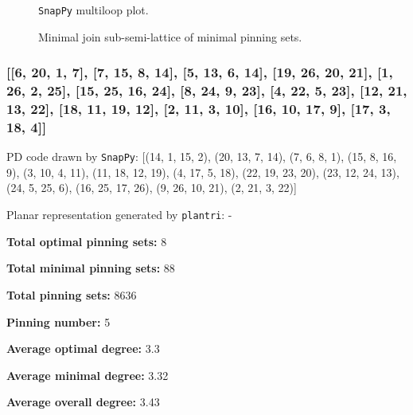 \documentclass{article}%
\begin{document}
\begin{multicols}{2}
\begin{figure}[H]
\centering

\caption{\texttt{SnapPy} multiloop plot.}
\label{fig:tex/img/[[22, 26, 1, 23], [23, 9, 24, 10], [16, 21, 17, 22], [7, 25, 8, 26], [1, 8, 2, 9], [24, 2, 25, 3], [10, 15, 11, 16], [11, 20, 12, 21], [17, 6, 18, 7], [3, 14, 4, 15], [4, 19, 5, 20], [12, 5, 13, 6], [.svg}
\end{figure}
\columnbreak

\begin{figure}[H]
\centering
\scalebox{0.8}{}
\caption{Minimal join sub-semi-lattice of minimal pinning sets.}
\label{fig:tex/img/[[22, 26, 1, 23], [23, 9, 24, 10], [16, 21, 17, 22], [7, 25, 8, 26], [1, 8, 2, 9], [24, 2, 25, 3], [10, 15, 11, 16], [11, 20, 12, 21], [17, 6, 18, 7], [3, 14, 4, 15], [4, 19, 5, 20], [12, 5, 13, 6], [.pgf}
\end{figure}
\end{multicols}

\newpage

\subsubsection{[[6, 20, 1, 7], [7, 15, 8, 14], [5, 13, 6, 14], [19, 26, 20, 21], [1, 26, 2, 25], [15, 25, 16, 24], [8, 24, 9, 23], [4, 22, 5, 23], [12, 21, 13, 22], [18, 11, 19, 12], [2, 11, 3, 10], [16, 10, 17, 9], [17, 3, 18, 4]]}

{\small\noindent PD code drawn by \texttt{SnapPy}: [(14, 1, 15, 2), (20, 13, 7, 14), (7, 6, 8, 1), (15, 8, 16, 9), (3, 10, 4, 11), (11, 18, 12, 19), (4, 17, 5, 18), (22, 19, 23, 20), (23, 12, 24, 13), (24, 5, 25, 6), (16, 25, 17, 26), (9, 26, 10, 21), (2, 21, 3, 22)]}

{\small\noindent Planar representation generated by \texttt{plantri}: -}

\begin{multicols}{2}
{\normalsize \noindent\textbf{Total optimal pinning sets:} 8

\noindent\textbf{Total minimal pinning sets:} 88

\noindent\textbf{Total pinning sets:} 8636

\noindent\textbf{Pinning number:} 5

}
\columnbreak

{\normalsize \noindent\textbf{Average optimal degree:} 3.3

\noindent\textbf{Average minimal degree:} 3.32

\noindent\textbf{Average overall degree:} 3.43

}
\end{multicols}
\end{document}
